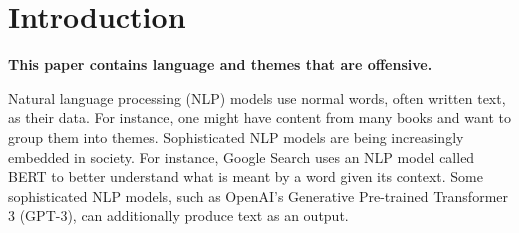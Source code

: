 \documentclass{bmcart}
\begin{document}
\begin{frontmatter}
\begin{abstractbox}
\begin{keyword}
\end{keyword}


\end{abstractbox}
%

\end{frontmatter}



\section{Introduction}\label{introduction}

\textbf{This paper contains language and themes that are offensive.}

Natural language processing (NLP) models use normal words, often written text, as their data. For instance, one might have content from many books and want to group them into themes. Sophisticated NLP models are being increasingly embedded in society. For instance, Google Search uses an NLP model called BERT to better understand what is meant by a word given its context. Some sophisticated NLP models, such as OpenAI's Generative Pre-trained Transformer 3 (GPT-3), can additionally produce text as an output.
\end{document}
